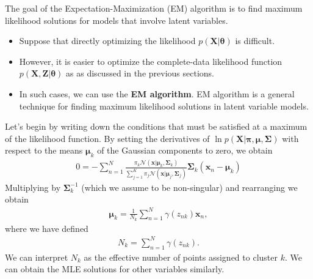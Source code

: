 The goal of the Expectation-Maximization (EM) algorithm is to find maximum likelihood solutions for models that involve latent variables.
\begin{itemize}
	\item Suppose that directly optimizing the likelihood $p(\mathbf{X}|\boldsymbol{\theta})$ is difficult.
	\item However, it is easier to optimize the complete-data likelihood function $p(\mathbf{X}, \mathbf{Z}|\boldsymbol{\theta})$ as as discussed in the previous sections.
	\item In such cases, we can use the \textbf{EM algorithm}. EM algorithm is a general technique for finding maximum likelihood solutions in latent variable models. 
\end{itemize}
Let's begin by writing down the conditions that must be satisfied at a maximum of the likelihood function. By setting the derivatives of $\ln p(\mathbf{X}|\boldsymbol{\pi},\boldsymbol{\mu},\boldsymbol{\Sigma})$ with respect to the means $\boldsymbol{\mu}_k$ of the Gaussian components to zero, we obtain
\begin{align*}
	0 = -\sum_{n=1}^N\frac{\pi_k\mathcal{N}(\mathbf{x}|\boldsymbol{\mu}_k, \boldsymbol{\Sigma}_k)}{\sum_{j=1}^{K} \pi_j\mathcal{N}(\mathbf{x}|\boldsymbol{\mu}_j, \boldsymbol{\Sigma}_j)}\boldsymbol{\Sigma}_k(\mathbf{x}_n-\boldsymbol{\mu}_k)
\end{align*}
Multiplying by $\boldsymbol{\Sigma}_k^{-1}$ (which we assume to be non-singular) and rearranging we obtain
\begin{align*}
	\boldsymbol{\mu}_k = \frac{1}{N_k}\sum_{n=1}^{N}\gamma(z_{nk})\mathbf{x}_n, 
\end{align*}
where we have defined
\begin{align*}
	N_k = \sum_{n=1}^{N}\gamma(z_{nk}).
\end{align*}
We can interpret $N_k$ as the effective number of points assigned to cluster $k$. We can obtain the MLE solutions for other variables similarly.
